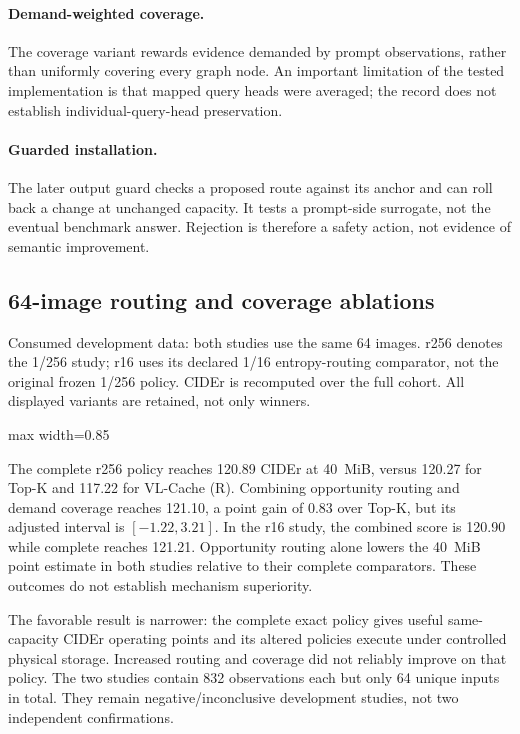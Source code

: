 \documentclass[10pt,letterpaper]{article}
\newcommand{\resulttable}[2]{\begin{center}\small\begin{adjustbox}{max width=#1}\end{adjustbox}\end{center}}
\begin{document}
\paragraph{Demand-weighted coverage.}
The coverage variant rewards evidence demanded by prompt observations,
rather than uniformly covering every graph node. An important limitation
of the tested implementation is that mapped query heads were averaged;
the record does not establish individual-query-head preservation.
\paragraph{Guarded installation.}
The later output guard checks a proposed route against its anchor and can
roll back a change at unchanged capacity. It tests a prompt-side surrogate,
not the eventual benchmark answer. Rejection is therefore a safety action,
not evidence of semantic improvement.

\subsection{64-image routing and coverage ablations}
\begin{table}[htbp]
\caption{Consumed development data: both studies use the same 64 images.
r256 denotes the 1/256 study; r16 uses its declared 1/16 entropy-routing
comparator, not the original frozen 1/256 policy. CIDEr is recomputed over
the full cohort. All displayed variants are retained, not only winners.}
\label{tab:fox64}
\resulttable{0.85\linewidth}{fox64}
\end{table}

The complete r256 policy reaches 120.89 CIDEr at 40~MiB, versus 120.27
for Top-K and 117.22 for VL-Cache (R). Combining opportunity routing and
demand coverage reaches 121.10, a point gain of 0.83 over Top-K, but its
adjusted interval is $[-1.22,3.21]$. In the r16 study, the combined score
is 120.90 while complete reaches 121.21. Opportunity routing alone lowers
the 40~MiB point estimate in both studies relative to their complete
comparators. These outcomes do not establish mechanism superiority.

The favorable result is narrower: the complete exact policy gives useful
same-capacity CIDEr operating points and its altered policies execute under
controlled physical storage. Increased routing and coverage did not reliably
improve on that policy. The two studies contain 832 observations each but
only 64 unique inputs in total. They remain negative/inconclusive development
studies, not two independent confirmations.
\end{document}
